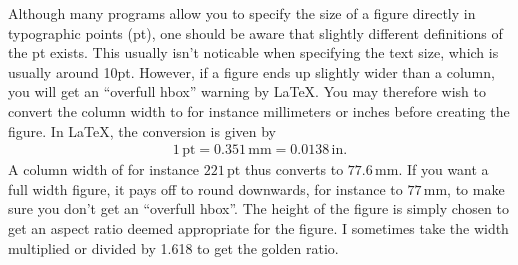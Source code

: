 \documentclass[a4paper,twocolumn]{article}
\makeatletter
\newcommand{\extract}{
\noindent
Text width: \the\textwidth.\\
Column width: \the\columnwidth.\\
Line width \the\linewidth.\\
Font family: \f@family.\\
Text size: \f@size pt.
}
\makeatother
\begin{document}
Although many programs allow you to specify the size of a figure directly in typographic points (pt), one should be aware that slightly different definitions of the pt exists.
This usually isn't noticable when specifying the text size, which is usually around 10pt.
However, if a figure ends up slightly wider than a column, you will get an ``overfull hbox'' warning by \LaTeX{}.
You may therefore wish to convert the column width to for instance millimeters or inches before creating the figure.
In \LaTeX{}, the conversion is given by
\begin{align}
    1\,\mathrm{pt} = 0.351\,\mathrm{mm} = 0.0138\,\mathrm{in}.
\end{align}
A column width of for instance $221\,\mathrm{pt}$ thus converts to $77.6\,\mathrm{mm}$.
If you want a full width figure, it pays off to round downwards, for instance to $77\,\mathrm{mm}$, to make sure you don't get an ``overfull hbox''.
The height of the figure is simply chosen to get an aspect ratio deemed appropriate for the figure. I sometimes take the width multiplied or divided by 1.618 to get the golden ratio.

\end{document}
